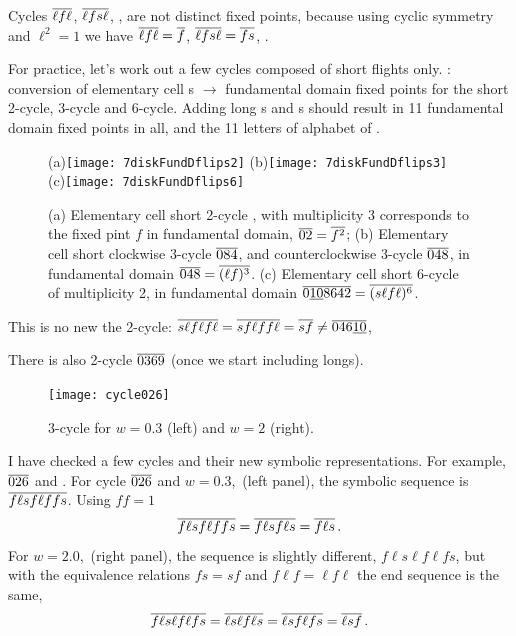 Cycles ${\overline{\ell f\ell}}$,
${\overline{\ell fs\ell}}$,
\etc, are not distinct fixed points, because using cyclic symmetry and
$\ell^2 =1$ we have
 ${\overline{\ell f\ell}}={\overline{f}}$,
${\overline{\ell fs\ell}}={\overline{fs}}$, \etc.


For practice, let's work out a
few  cycles composed of short flights only.
: conversion of elementary cell \po s $\to$
fundamental domain fixed points for the short 2-cycle, 3-cycle and
6-cycle.
Adding long \po s and \rpo s should result in 11 fundamental domain fixed
points in all, and the 11 letters of alphabet of .

\begin{figure}
\begin{center}
(a)\texttt{[image: 7diskFundDflips2]}
(b)\texttt{[image: 7diskFundDflips3]}
\\
(c)\texttt{[image: 7diskFundDflips6]}
\end{center}
\caption{
(a) Elementary cell short 2-cycle , with multiplicity 3 corresponds to
the fixed pint $f$ in fundamental domain, ${\overline{02}}={\overline{f^2}}$;
(b) Elementary cell short clockwise 3-cycle ${\overline{084}}$, and
counterclockwise 3-cycle ${\overline{048}}$, in
fundamental domain ${\overline{048}}={\overline{(\ell f)^3}}$.
(c) Elementary cell short 6-cycle of multiplicity 2, in
fundamental domain ${\overline{0\underline{10}8642}}={\overline{(s\ell f\ell )^6}}$.
    }
\label{7diskFundDflips2A}
\end{figure}

This is no new the 2-cycle:
$ {\overline{s \ell f \ell f \ell}}
= {\overline{s f \ell f f \ell}}
= {\overline{s f}}
\neq {\ensuremath{\overline{046\underline{10}}}}$,

There is also 2-cycle ${\overline{0369}}$ (once we start including longs).

\begin{figure}
\texttt{[image: cycle026]}
\caption{3-cycle  for $w=0.3$ (left) and $w=2$ (right). }
\label{fig:cycle026A}
\end{figure}

I have checked a few cycles and their new symbolic representations. For
example, ${\overline{026}}$ and . For cycle ${\overline{026}}$ and
$w=0.3$, \,(left panel),
the symbolic sequence is ${\overline{f\ell sf\ell f fs}}$.
Using $f f = 1$
\[
{\overline{f\ell sf\ell f fs}}
    = {\overline{f\ell sf\ell s}}
    = {\overline{f\ell s}}
\,.
\]
For $w=2.0$, \,(right panel), the
sequence is slightly different, $f\ell s\ell f \ell fs$, but with the
equivalence relations
$f s = s f$ and $f \ell f = \ell f \ell$ the end sequence is the
same,
\[
{\overline{f\ell s\ell f \ell fs}}
    = {\overline{\ell s\ell f \ell s}}
    = {\overline{\ell s f \ell f s}}
    = {\overline{\ell s f}}
\,.
\]

